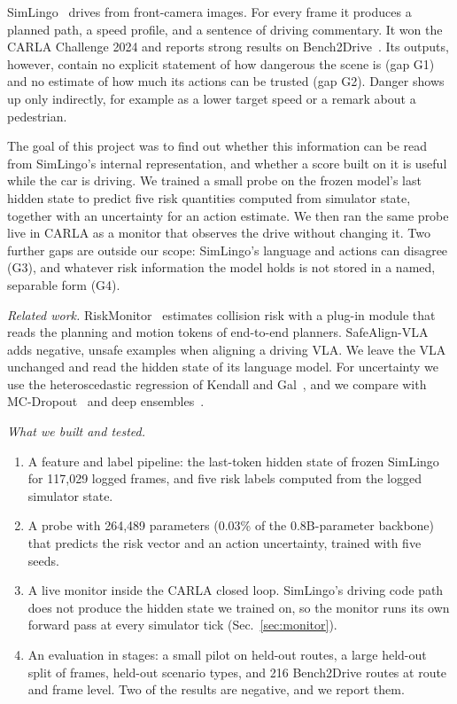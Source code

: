 \documentclass[conference]{IEEEtran}
\begin{document}
SimLingo~\cite{renz2025simlingo} drives from front-camera images. For every frame
it produces a planned path, a speed profile, and a sentence of driving commentary.
It won the CARLA Challenge 2024 and reports strong results on
Bench2Drive~\cite{jia2024bench2drive}. Its outputs, however, contain no explicit
statement of how dangerous the scene is (gap G1) and no estimate of how much its
actions can be trusted (gap G2). Danger shows up only indirectly, for example as a
lower target speed or a remark about a pedestrian.

The goal of this project was to find out whether this information can be read from
SimLingo's internal representation, and whether a score built on it is useful while
the car is driving. We trained a small probe on the frozen model's last hidden state
to predict five risk quantities computed from simulator state, together with an
uncertainty for an action estimate. We then ran the same probe live in CARLA as a
monitor that observes the drive without changing it. Two further gaps are outside
our scope: SimLingo's language and actions can disagree (G3), and whatever risk
information the model holds is not stored in a named, separable form (G4).

\emph{Related work.} RiskMonitor~\cite{xiong2025riskmonitor} estimates collision
risk with a plug-in module that reads the planning and motion tokens of end-to-end
planners. SafeAlign-VLA~\cite{tian2026safealign} adds negative, unsafe examples
when aligning a driving VLA. We leave the VLA unchanged and read the hidden state of
its language model. For uncertainty we use the heteroscedastic regression of Kendall
and Gal~\cite{kendall2017uncertainties,kendall2018multitask}, and we compare with
MC-Dropout~\cite{gal2016dropout} and deep
ensembles~\cite{lakshminarayanan2017ensembles}.

\emph{What we built and tested.}
\begin{enumerate}
\item A feature and label pipeline: the last-token hidden state of frozen SimLingo
for 117{,}029 logged frames, and five risk labels computed from the logged simulator
state.
\item A probe with 264{,}489 parameters (0.03\% of the 0.8B-parameter backbone)
that predicts the risk vector and an action uncertainty, trained with five seeds.
\item A live monitor inside the CARLA closed loop. SimLingo's driving code path does
not produce the hidden state we trained on, so the monitor runs its own forward pass
at every simulator tick (Sec.~\ref{sec:monitor}).
\item An evaluation in stages: a small pilot on held-out routes, a large held-out
split of frames, held-out scenario types, and 216 Bench2Drive routes at route and
frame level. Two of the results are negative, and we report them.
\end{enumerate}
\end{document}
